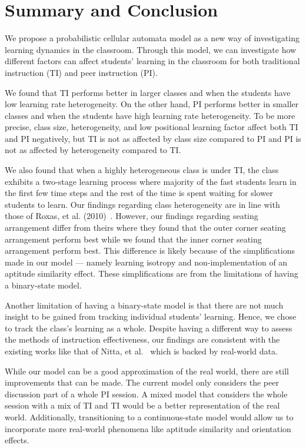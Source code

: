 \documentclass[twocolumn,secnumarabic,amssymb, nobibnotes, aps, prd]{revtex4-2}
\begin{document}
\section{Summary and Conclusion}
    We propose a probabilistic cellular automata model as a new way of investigating learning dynamics in the classroom.
    Through this model, we can investigate how different factors can affect students' learning in the classroom for both traditional instruction (TI) and peer instruction (PI).

    We found that TI performs better in larger classes and when the students have low learning rate heterogeneity.
    On the other hand, PI performs better in smaller classes and when the students have high learning rate heterogeneity.
    To be more precise, class size, heterogeneity, and low positional learning factor affect both TI and PI negatively, but TI is not as affected by class size compared to PI and PI is not as affected by heterogeneity compared to TI.

    We also found that when a highly heterogeneous class is under TI, the class exhibits a two-stage learning process where majority of the fast students learn in the first few time steps and the rest of the time is spent waiting for slower students to learn. Our findings regarding class heterogeneity are in line with those of Roxas, et al. (2010)~\cite{roxas2010seating}.
    However, our findings regarding seating arrangement differ from theirs where they found that the outer corner seating arrangement perform best while we found that the inner corner seating arrangement perform best.
    This difference is likely because of the simplifications made in our model --- namely learning isotropy and non-implementation of an aptitude similarity effect.
    These simplifications are from the limitations of having a binary-state model.

    Another limitation of having a binary-state model is that there are not much insight to be gained from tracking individual students' learning.
    Hence, we chose to track the class's learning as a whole.
    Despite having a different way to assess the methods of instruction effectiveness, our findings are consistent with the existing works like that of Nitta, et al.~\cite{nitta2019mathematical} which is backed by real-world data.

    While our model can be a good approximation of the real world, there are still improvements that can be made.
    The current model only considers the peer discussion part of a whole PI session.
    A mixed model that considers the whole session with a mix of TI and TI would be a better representation of the real world.
    Additionally, transitioning to a continuous-state model would allow us to incorporate more real-world phenomena like aptitude similarity and orientation effects.



\end{document}
